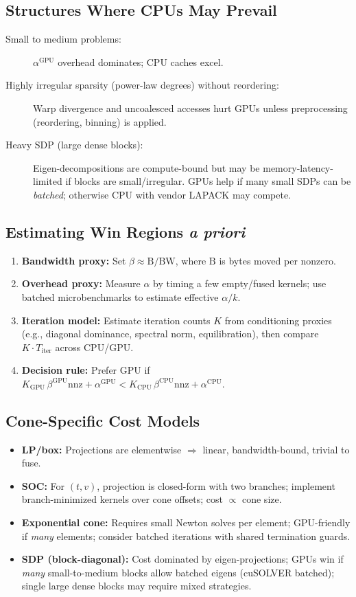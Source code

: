 \documentclass[12pt]{article}
\begin{document}
\subsection*{Structures Where CPUs May Prevail}
\begin{description}
  \item[Small to medium problems:] $\alpha^{\text{GPU}}$ overhead dominates; CPU caches excel.
  \item[Highly irregular sparsity (power-law degrees) without reordering:] Warp divergence and uncoalesced accesses hurt GPUs unless preprocessing (reordering, binning) is applied.
  \item[Heavy SDP (large dense blocks):] Eigen-decompositions are compute-bound but may be memory-latency-limited if blocks are small/irregular. GPUs help if many small SDPs can be \emph{batched}; otherwise CPU with vendor LAPACK may compete.
\end{description}

\subsection*{Estimating Win Regions \emph{a priori}}
\begin{enumerate}[label=(\alph*)]
  \item \textbf{Bandwidth proxy:} Set $\beta \approx \text{B}/\text{BW}$, where $\text{B}$ is bytes moved per nonzero. 
  \item \textbf{Overhead proxy:} Measure $\alpha$ by timing a few empty/fused kernels; use batched microbenchmarks to estimate effective $\alpha/k$.
  \item \textbf{Iteration model:} Estimate iteration counts $K$ from conditioning proxies (e.g., diagonal dominance, spectral norm, equilibration), then compare $K \cdot T_{\text{iter}}$ across CPU/GPU.
  \item \textbf{Decision rule:} Prefer GPU if $K_{\text{GPU}} \,\beta^{\text{GPU}} \mathrm{nnz} + \alpha^{\text{GPU}} < K_{\text{CPU}} \,\beta^{\text{CPU}} \mathrm{nnz} + \alpha^{\text{CPU}}$. 
\end{enumerate}

\subsection*{Cone-Specific Cost Models}
\begin{itemize}
  \item \textbf{LP/box:} Projections are elementwise $\Rightarrow$ linear, bandwidth-bound, trivial to fuse.
  \item \textbf{SOC:} For $(t,v)$, projection is closed-form with two branches; implement branch-minimized kernels over cone offsets; cost $\propto$ cone size.
  \item \textbf{Exponential cone:} Requires small Newton solves per element; GPU-friendly if \emph{many} elements; consider batched iterations with shared termination guards.
  \item \textbf{SDP (block-diagonal):} Cost dominated by eigen-projections; GPUs win if \emph{many} small-to-medium blocks allow batched eigens (cuSOLVER batched); single large dense blocks may require mixed strategies.
\end{itemize}
\end{document}
